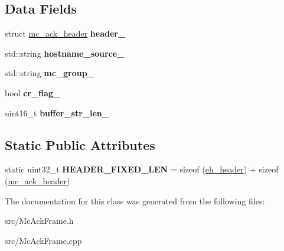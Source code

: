 \subsection*{Data Fields}
\begin{DoxyCompactItemize}
\item 
\hypertarget{classMcAckFrame_a387a487258edc82e4107e4ffa9081029}{struct \hyperlink{structmc__ack__header}{mc\-\_\-ack\-\_\-header} {\bfseries header\-\_\-}}\label{classMcAckFrame_a387a487258edc82e4107e4ffa9081029}

\item 
\hypertarget{classMcAckFrame_ac243aece3e45e022c3c3d2dd2978a7fb}{std\-::string {\bfseries hostname\-\_\-source\-\_\-}}\label{classMcAckFrame_ac243aece3e45e022c3c3d2dd2978a7fb}

\item 
\hypertarget{classMcAckFrame_a008d351c128ff700d8bfab5abaef8020}{std\-::string {\bfseries mc\-\_\-group\-\_\-}}\label{classMcAckFrame_a008d351c128ff700d8bfab5abaef8020}

\item 
\hypertarget{classMcAckFrame_aa7de0709e7c4c89b156bc6def18d9f41}{bool {\bfseries cr\-\_\-flag\-\_\-}}\label{classMcAckFrame_aa7de0709e7c4c89b156bc6def18d9f41}

\item 
\hypertarget{classMcAckFrame_aaa7104cc9db2135e984d8320079e53a2}{uint16\-\_\-t {\bfseries buffer\-\_\-str\-\_\-len\-\_\-}}\label{classMcAckFrame_aaa7104cc9db2135e984d8320079e53a2}

\end{DoxyCompactItemize}
\subsection*{Static Public Attributes}
\begin{DoxyCompactItemize}
\item 
\hypertarget{classMcAckFrame_a060c62e4e65dd045187cac7324f6fb58}{static uint32\-\_\-t {\bfseries H\-E\-A\-D\-E\-R\-\_\-\-F\-I\-X\-E\-D\-\_\-\-L\-E\-N} = sizeof (\hyperlink{structeh__header}{eh\-\_\-header}) + sizeof (\hyperlink{structmc__ack__header}{mc\-\_\-ack\-\_\-header})}\label{classMcAckFrame_a060c62e4e65dd045187cac7324f6fb58}

\end{DoxyCompactItemize}


The documentation for this class was generated from the following files\-:\begin{DoxyCompactItemize}
\item 
src/Mc\-Ack\-Frame.\-h\item 
src/Mc\-Ack\-Frame.\-cpp\end{DoxyCompactItemize}
